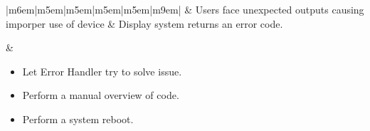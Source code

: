 \documentclass{article}
\begin{document}
\begin{tabular}{|m{6em}|m{5em}|m{5em}|m{5em}|m{5em}|m{9em}|}
	& Users face unexpected outputs causing imporper use of device                                                                
        & Display system returns an error code.

        & \begin{minipage}[t]{\linewidth}
              \begin{itemize}[nosep, wide=0pt, leftmargin=*, after=\strut]
	            \item Let Error Handler try to solve issue.
	            \item Perform a manual overview of code.
		    \item Perform a system reboot.
               \end{itemize}
            \end{minipage}  \tabularnewline{}
\end{tabular}%
\end{document}
